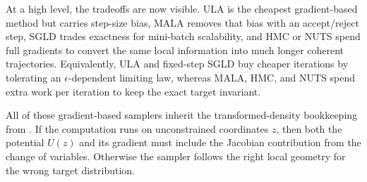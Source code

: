 At a high level, the tradeoffs are now visible.
ULA is the cheapest gradient-based method but carries step-size bias, MALA removes that bias with an accept/reject step, SGLD trades exactness for mini-batch scalability, and HMC or NUTS spend full gradients to convert the same local information into much longer coherent trajectories.
Equivalently, ULA and fixed-step SGLD buy cheaper iterations by tolerating an \(\epsilon\)-dependent limiting law, whereas MALA, HMC, and NUTS spend extra work per iteration to keep the exact target invariant.

All of these gradient-based samplers inherit the transformed-density bookkeeping from .
If the computation runs on unconstrained coordinates $z$, then both the potential $U(z)$ and its gradient must include the Jacobian contribution from the change of variables.
Otherwise the sampler follows the right local geometry for the wrong target distribution.
